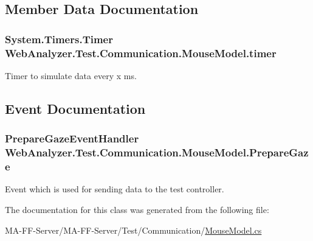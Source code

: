 \subsection{Member Data Documentation}
\hypertarget{class_web_analyzer_1_1_test_1_1_communication_1_1_mouse_model_a59254b95befed343634d46aff30dd80b}{}
\subsubsection[{timer}]{\setlength{\rightskip}{0pt plus 5cm}System.\+Timers.\+Timer Web\+Analyzer.\+Test.\+Communication.\+Mouse\+Model.\+timer\hspace{0.3cm}{\ttfamily [private]}}\label{class_web_analyzer_1_1_test_1_1_communication_1_1_mouse_model_a59254b95befed343634d46aff30dd80b}


Timer to simulate data every x ms. 



\subsection{Event Documentation}
\hypertarget{class_web_analyzer_1_1_test_1_1_communication_1_1_mouse_model_ad799e6cf6032401ee7d8b1706d7c8a20}{}
\subsubsection[{Prepare\+Gaze}]{\setlength{\rightskip}{0pt plus 5cm}Prepare\+Gaze\+Event\+Handler Web\+Analyzer.\+Test.\+Communication.\+Mouse\+Model.\+Prepare\+Gaze}\label{class_web_analyzer_1_1_test_1_1_communication_1_1_mouse_model_ad799e6cf6032401ee7d8b1706d7c8a20}


Event which is used for sending data to the test controller. 



The documentation for this class was generated from the following file\+:\begin{DoxyCompactItemize}
\item 
M\+A-\/\+F\+F-\/\+Server/\+M\+A-\/\+F\+F-\/\+Server/\+Test/\+Communication/\hyperlink{_mouse_model_8cs}{Mouse\+Model.\+cs}\end{DoxyCompactItemize}
